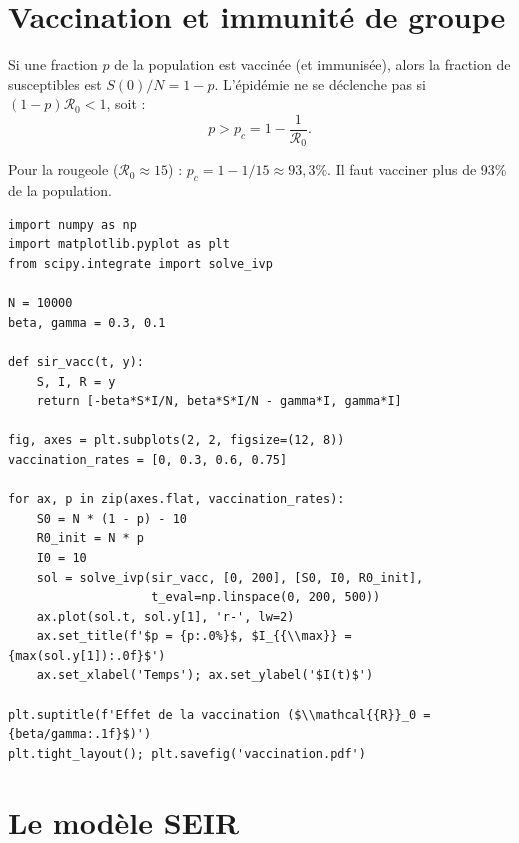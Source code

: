 \section{Vaccination et immunit\'e de groupe}
\label{sec:vaccination}

\begin{theoreme}
Si une fraction $p$ de la population est vaccin\'ee (et immunis\'ee),
alors la fraction de susceptibles est $S(0)/N = 1-p$.  L'\'epid\'emie
ne se d\'eclenche pas si $(1-p)\mathcal{R}_0 < 1$, soit :
\[
  p > p_c = 1 - \frac{1}{\mathcal{R}_0}.
\]
\end{theoreme}

\begin{exemple}
Pour la rougeole ($\mathcal{R}_0\approx 15$) :
$p_c = 1 - 1/15 \approx 93{,}3\%$.
Il faut vacciner plus de 93\% de la population.
\end{exemple}

\begin{codeblock}[title=\textbf{Effet de la vaccination}]
\begin{verbatim}
import numpy as np
import matplotlib.pyplot as plt
from scipy.integrate import solve_ivp

N = 10000
beta, gamma = 0.3, 0.1

def sir_vacc(t, y):
    S, I, R = y
    return [-beta*S*I/N, beta*S*I/N - gamma*I, gamma*I]

fig, axes = plt.subplots(2, 2, figsize=(12, 8))
vaccination_rates = [0, 0.3, 0.6, 0.75]

for ax, p in zip(axes.flat, vaccination_rates):
    S0 = N * (1 - p) - 10
    R0_init = N * p
    I0 = 10
    sol = solve_ivp(sir_vacc, [0, 200], [S0, I0, R0_init],
                    t_eval=np.linspace(0, 200, 500))
    ax.plot(sol.t, sol.y[1], 'r-', lw=2)
    ax.set_title(f'$p = {p:.0%}$, $I_{{\\max}} = {max(sol.y[1]):.0f}$')
    ax.set_xlabel('Temps'); ax.set_ylabel('$I(t)$')

plt.suptitle(f'Effet de la vaccination ($\\mathcal{{R}}_0 = {beta/gamma:.1f}$)')
plt.tight_layout(); plt.savefig('vaccination.pdf')
\end{verbatim}
\end{codeblock}

\section{Le mod\`ele SEIR}
\label{sec:seir}

